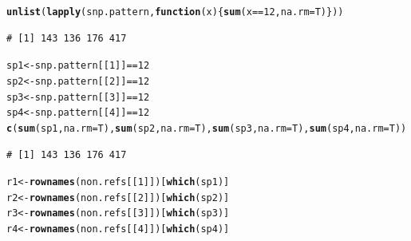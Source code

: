 \documentclass{article}\usepackage[]{graphicx}\usepackage[]{color}
\makeatletter
\newcommand{\hlnum}[1]{\textcolor[rgb]{0.686,0.059,0.569}{#1}}%
\newcommand{\hlopt}[1]{\textcolor[rgb]{0,0,0}{#1}}%
\newcommand{\hlstd}[1]{\textcolor[rgb]{0.345,0.345,0.345}{#1}}%
\newcommand{\hlkwa}[1]{\textcolor[rgb]{0.161,0.373,0.58}{\textbf{#1}}}%
\newcommand{\hlkwb}[1]{\textcolor[rgb]{0.69,0.353,0.396}{#1}}%
\newcommand{\hlkwc}[1]{\textcolor[rgb]{0.333,0.667,0.333}{#1}}%
\newcommand{\hlkwd}[1]{\textcolor[rgb]{0.737,0.353,0.396}{\textbf{#1}}}%
\newenvironment{kframe}{%
 \def\at@end@of@kframe{}%
 \ifinner\ifhmode%
  \def\at@end@of@kframe{\end{minipage}}%
  \begin{minipage}{\columnwidth}%
 \fi\fi%
 \def\FrameCommand##1{\hskip\@totalleftmargin \hskip-\fboxsep
 \colorbox{shadecolor}{##1}\hskip-\fboxsep
     \hskip-\linewidth \hskip-\@totalleftmargin \hskip\columnwidth}%
 \MakeFramed {\advance\hsize-\width
   \@totalleftmargin\z@ \linewidth\hsize
   \@setminipage}}%
 {\par\unskip\endMakeFramed%
 \at@end@of@kframe}
\newenvironment{knitrout}{}{} %
\makeatother
\begin{document}
\begin{knitrout}\footnotesize
{}\color{fgcolor}\begin{kframe}
\begin{alltt}
\hlkwd{unlist}\hlstd{(}\hlkwd{lapply}\hlstd{(snp.pattern,}\hlkwa{function}\hlstd{(}\hlkwc{x}\hlstd{)\{}\hlkwd{sum}\hlstd{(x}\hlopt{==}\hlnum{12}\hlstd{,}\hlkwc{na.rm}\hlstd{=T)\}))}
\end{alltt}
\begin{verbatim}
# [1] 143 136 176 417
\end{verbatim}
\begin{alltt}
\hlstd{sp1} \hlkwb{<-} \hlstd{snp.pattern[[}\hlnum{1}\hlstd{]]}\hlopt{==}\hlnum{12}
\hlstd{sp2} \hlkwb{<-} \hlstd{snp.pattern[[}\hlnum{2}\hlstd{]]}\hlopt{==}\hlnum{12}
\hlstd{sp3} \hlkwb{<-} \hlstd{snp.pattern[[}\hlnum{3}\hlstd{]]}\hlopt{==}\hlnum{12}
\hlstd{sp4} \hlkwb{<-} \hlstd{snp.pattern[[}\hlnum{4}\hlstd{]]}\hlopt{==}\hlnum{12}
\hlkwd{c}\hlstd{(}\hlkwd{sum}\hlstd{(sp1,}\hlkwc{na.rm}\hlstd{=T),} \hlkwd{sum}\hlstd{(sp2,}\hlkwc{na.rm}\hlstd{=T),} \hlkwd{sum}\hlstd{(sp3,}\hlkwc{na.rm}\hlstd{=T),} \hlkwd{sum}\hlstd{(sp4,}\hlkwc{na.rm}\hlstd{=T))}
\end{alltt}
\begin{verbatim}
# [1] 143 136 176 417
\end{verbatim}
\begin{alltt}
\hlstd{r1} \hlkwb{<-} \hlkwd{rownames}\hlstd{(non.refs[[}\hlnum{1}\hlstd{]])[}\hlkwd{which}\hlstd{(sp1)]}
\hlstd{r2} \hlkwb{<-} \hlkwd{rownames}\hlstd{(non.refs[[}\hlnum{2}\hlstd{]])[}\hlkwd{which}\hlstd{(sp2)]}
\hlstd{r3} \hlkwb{<-} \hlkwd{rownames}\hlstd{(non.refs[[}\hlnum{3}\hlstd{]])[}\hlkwd{which}\hlstd{(sp3)]}
\hlstd{r4} \hlkwb{<-} \hlkwd{rownames}\hlstd{(non.refs[[}\hlnum{4}\hlstd{]])[}\hlkwd{which}\hlstd{(sp4)]}


\end{alltt}
\end{kframe}
\end{knitrout}
\end{document}

